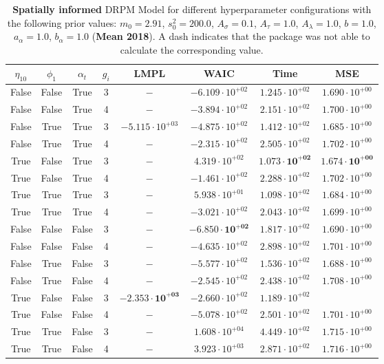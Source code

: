 \documentclass[12pt,a4paper]{article}
\begin{document}
\begin{table}
\caption{\textbf{Spatially informed} DRPM Model for different hyperparameter configurations with the following prior values: $m_0 = 2.91$, $s_0^2 
= 200.0$, $A_\sigma = 0.1$, $A_\tau = 1.0$, $A_\lambda = 1.0$, $b = 1.0$, $a_\alpha = 1.0$, $b_\alpha = 1.0$ (\textbf{Mean 2018}).
A dash indicates that the package was not able to calculate the corresponding value.
}
\centering\begin{tabular}{cccccccc}
\toprule
$\eta_{10}$ & $\phi_1$ & $\alpha_t$ & $g_i$ & LMPL & WAIC & Time & MSE \\
\midrule
False & False & True & 3 & $-$ & $-6.109 \cdot 10^{+02}$ & $1.245 \cdot 10^{+02}$ & $1.690 \cdot 10^{+00}$ \\
False & False & True & 4 & $-$ & $-3.894 \cdot 10^{+02}$ & $2.151 \cdot 10^{+02}$ & $1.700 \cdot 10^{+00}$ \\
False & True & True & 3 & $-5.115 \cdot 10^{+03}$ & $-4.875 \cdot 10^{+02}$ & $1.412 \cdot 10^{+02}$ & $1.685 \cdot 10^{+00}$ \\
False & True & True & 4 & $-$ & $-2.315 \cdot 10^{+02}$ & $2.505 \cdot 10^{+02}$ & $1.702 \cdot 10^{+00}$ \\
True & False & True & 3 & $-$ & $4.319 \cdot 10^{+02}$ & $\mathbf{1.073 \cdot 10^{+02}}$ & $\mathbf{1.674 \cdot 10^{+00}}$ \\
True & False & True & 4 & $-$ & $-1.461 \cdot 10^{+02}$ & $2.288 \cdot 10^{+02}$ & $1.702 \cdot 10^{+00}$ \\
True & True & True & 3 & $-$ & $5.938 \cdot 10^{+01}$ & $1.098 \cdot 10^{+02}$ & $1.684 \cdot 10^{+00}$ \\
True & True & True & 4 & $-$ & $-3.021 \cdot 10^{+02}$ & $2.043 \cdot 10^{+02}$ & $1.699 \cdot 10^{+00}$ \\
False & False & False & 3 & $-$ & $\mathbf{-6.850 \cdot 10^{+02}}$ & $1.817 \cdot 10^{+02}$ & $1.690 \cdot 10^{+00}$ \\
False & False & False & 4 & $-$ & $-4.635 \cdot 10^{+02}$ & $2.898 \cdot 10^{+02}$ & $1.701 \cdot 10^{+00}$ \\
False & True & False & 3 & $-$ & $-5.577 \cdot 10^{+02}$ & $1.536 \cdot 10^{+02}$ & $1.688 \cdot 10^{+00}$ \\
False & True & False & 4 & $-$ & $-2.545 \cdot 10^{+02}$ & $2.438 \cdot 10^{+02}$ & $1.708 \cdot 10^{+00}$ \\
True & False & False & 3 & $\mathbf{-2.353 \cdot 10^{+03}}$ & $-2.660 \cdot 10^{+02}$ & $1.189 \cdot 10^{+02}$ \\
True & False & False & 4 & $-$ & $-5.078 \cdot 10^{+02}$ & $2.501 \cdot 10^{+02}$ & $1.701 \cdot 10^{+00}$ \\
True & True & False & 3 & $-$ & $1.608 \cdot 10^{+04}$ & $4.449 \cdot 10^{+02}$ & $1.715 \cdot 10^{+00}$ \\
True & True & False & 4 & $-$ & $3.923 \cdot 10^{+03}$ & $2.871 \cdot 10^{+02}$ & $1.716 \cdot 10^{+00}$ \\
\bottomrule
\end{tabular}
\label{tab:DRPMExtensionMean2018}
\end{table}
\end{document}
